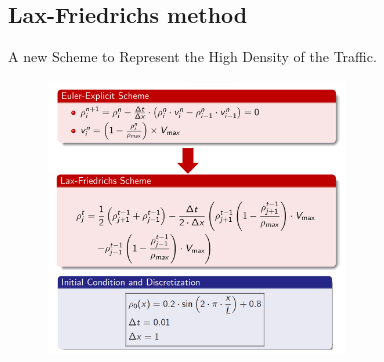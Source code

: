 \documentclass{beamer}
\begin{document}
\subsection{Lax-Friedrichs method}
\begin{frame}{A new Scheme to Represent the High Density of the Traffic.}
	\begin{figure}
		\centering
		\includegraphics[width=0.7\textwidth]{test3.png}
	\end{figure}
\end{frame}
\end{document}
